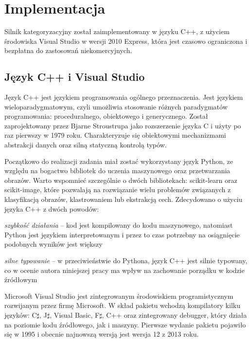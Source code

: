 \chapter{Implementacja}

Silnik kategoryzacyjny został zaimplementowany w języku C++, z użyciem środowiska Visual Studio w wersji 2010 Express, która jest czasowo ograniczona i bezpłatna do zastosowań niekomercyjnych.

\section{Język C++ i Visual Studio}

Język C++ jest językiem programowania ogólnego przeznaczenia. Jest językiem wieloparadygmatowym, czyli umożliwia stosowanie różnych paradygmatów programowania: proceduralnego, obiektowego i generycznego. Został zaprojektowany przez Bjarne Stroustrupa jako rozszerzenie języka C i użyty po raz pierwszy w 1979 roku. Charakteryzuje się obiektowymi mechanizmami abstrakcji danych oraz silną statyczną kontrolą typów.

Początkowo do realizacji zadania miał zostać wykorzystany język Python, ze względu na bogactwo bibliotek do uczenia maszynowego oraz przetwarzania obrazów. Warto wspomnieć szczególnie o dwóch bibliotekach: scikit-learn oraz scikit-image, które pozwalają na rozwiązanie wielu problemów związanych z klasyfikacją obrazów, klastrowaniem lub ekstrakcją cech. Zdecydowano o użyciu języka C++ z dwóch powodów:

\begin{compactitem}
	\item \emph{szybkość działania} -- kod jest kompilowany do kodu maszynowego, natomiast Python jest językiem interpretowanym i przez to czas potrzebny na osiągnięcie podobnych wyników jest większy
	\item \emph{silne typowanie} -- w przeciwieństwie do Pythona, język C++ jest silnie typowany, co w ocenie autora niniejszej pracy ma wpływ na zachowanie porządku w kodzie źródłowym
\end{compactitem}

Microsoft Visual Studio jest zintegrowanym środowiskiem programistycznym rozwijanym przez firmę Microsoft. W skład pakietu wchodzą kompilatory kilku języków: C$\sharp$, J$\sharp$, Visual Basic, F$\sharp$, C++ oraz zintegrowany debugger, który działa na poziomie kodu źródłowego, jak i maszyny. Pierwsze wydanie pakietu pojawiło się w 1995 i obecnie najnowszą wersją jest wersja 12 z 2013 roku. 

